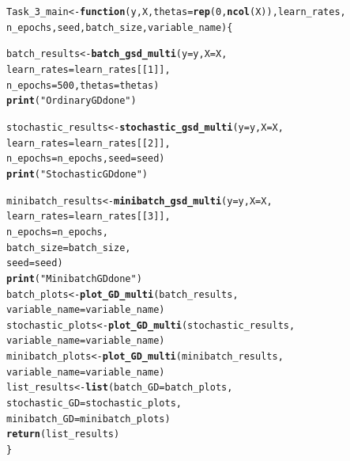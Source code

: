 \documentclass[11pt, a4paper, english]{article}\usepackage[]{graphicx}\usepackage[dvipsnames]{xcolor}
\makeatletter
\newcommand{\hlnum}[1]{\textcolor[rgb]{0.686,0.059,0.569}{#1}}%
\newcommand{\hlstr}[1]{\textcolor[rgb]{0.192,0.494,0.8}{#1}}%
\newcommand{\hlstd}[1]{\textcolor[rgb]{0.345,0.345,0.345}{#1}}%
\newcommand{\hlkwa}[1]{\textcolor[rgb]{0.161,0.373,0.58}{\textbf{#1}}}%
\newcommand{\hlkwb}[1]{\textcolor[rgb]{0.69,0.353,0.396}{#1}}%
\newcommand{\hlkwc}[1]{\textcolor[rgb]{0.333,0.667,0.333}{#1}}%
\newcommand{\hlkwd}[1]{\textcolor[rgb]{0.737,0.353,0.396}{\textbf{#1}}}%
\newenvironment{kframe}{%
 \def\at@end@of@kframe{}%
 \ifinner\ifhmode%
  \def\at@end@of@kframe{\end{minipage}}%
  \begin{minipage}{\columnwidth}%
 \fi\fi%
 \def\FrameCommand##1{\hskip\@totalleftmargin \hskip-\fboxsep
 \colorbox{shadecolor}{##1}\hskip-\fboxsep
     \hskip-\linewidth \hskip-\@totalleftmargin \hskip\columnwidth}%
 \MakeFramed {\advance\hsize-\width
   \@totalleftmargin\z@ \linewidth\hsize
   \@setminipage}}%
 {\par\unskip\endMakeFramed%
 \at@end@of@kframe}
\newenvironment{knitrout}{}{} %
\makeatother
\begin{document}
\begin{knitrout}
\color{fgcolor}\begin{kframe}
\begin{alltt}
\hlstd{Task_3_main} \hlkwb{<-} \hlkwa{function}\hlstd{(}\hlkwc{y}\hlstd{,} \hlkwc{X}\hlstd{,} \hlkwc{thetas} \hlstd{=} \hlkwd{rep}\hlstd{(}\hlnum{0}\hlstd{,} \hlkwd{ncol}\hlstd{(X)) ,} \hlkwc{learn_rates}\hlstd{,}
                        \hlkwc{n_epochs}\hlstd{,} \hlkwc{seed}\hlstd{,} \hlkwc{batch_size}\hlstd{,} \hlkwc{variable_name}\hlstd{)\{}

\hlstd{batch_results} \hlkwb{<-} \hlkwd{batch_gsd_multi}\hlstd{(}\hlkwc{y} \hlstd{= y,} \hlkwc{X}\hlstd{=X,}
                                 \hlkwc{learn_rates} \hlstd{= learn_rates[[}\hlnum{1}\hlstd{]],}
                                 \hlkwc{n_epochs} \hlstd{=} \hlnum{500}\hlstd{,} \hlkwc{thetas}\hlstd{=thetas)}
\hlkwd{print}\hlstd{(}\hlstr{"Ordinary GD done"}\hlstd{)}

\hlstd{stochastic_results} \hlkwb{<-} \hlkwd{stochastic_gsd_multi}\hlstd{(}\hlkwc{y} \hlstd{= y,} \hlkwc{X}\hlstd{=X,}
                                           \hlkwc{learn_rates} \hlstd{= learn_rates[[}\hlnum{2}\hlstd{]],}
                                           \hlkwc{n_epochs} \hlstd{= n_epochs,} \hlkwc{seed}\hlstd{=seed)}
\hlkwd{print}\hlstd{(}\hlstr{"Stochastic GD done"}\hlstd{)}

\hlstd{minibatch_results} \hlkwb{<-}  \hlkwd{minibatch_gsd_multi}\hlstd{(}\hlkwc{y} \hlstd{= y,} \hlkwc{X}\hlstd{=X,}
                                          \hlkwc{learn_rates} \hlstd{= learn_rates[[}\hlnum{3}\hlstd{]],}
                                          \hlkwc{n_epochs} \hlstd{= n_epochs,}
                                          \hlkwc{batch_size}\hlstd{=batch_size,}
                                          \hlkwc{seed}\hlstd{=seed)}
\hlkwd{print}\hlstd{(}\hlstr{"Minibatch GD done"}\hlstd{)}
\hlstd{batch_plots} \hlkwb{<-} \hlkwd{plot_GD_multi}\hlstd{(batch_results,}
                             \hlkwc{variable_name} \hlstd{= variable_name)}
\hlstd{stochastic_plots} \hlkwb{<-} \hlkwd{plot_GD_multi}\hlstd{(stochastic_results,}
                                  \hlkwc{variable_name} \hlstd{= variable_name)}
\hlstd{minibatch_plots} \hlkwb{<-} \hlkwd{plot_GD_multi}\hlstd{(minibatch_results,}
                                 \hlkwc{variable_name} \hlstd{= variable_name)}
\hlstd{list_results} \hlkwb{<-} \hlkwd{list}\hlstd{(}\hlkwc{batch_GD} \hlstd{=batch_plots,}
                     \hlkwc{stochastic_GD} \hlstd{= stochastic_plots,}
                     \hlkwc{minibatch_GD} \hlstd{= minibatch_plots)}
\hlkwd{return}\hlstd{(list_results)}
\hlstd{\}}
\end{alltt}
\end{kframe}
\end{knitrout}
\end{document}
